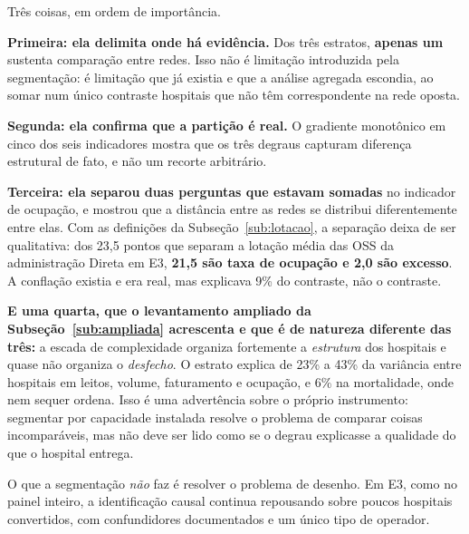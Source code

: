 Três coisas, em ordem de importância.

\textbf{Primeira: ela delimita onde há evidência.} Dos três estratos,
\textbf{apenas um} sustenta comparação entre redes. Isso não é limitação
introduzida pela segmentação: é limitação que já existia e que a análise
agregada escondia, ao somar num único contraste hospitais que não têm
correspondente na rede oposta.

\textbf{Segunda: ela confirma que a partição é real.} O gradiente monotônico
em cinco dos seis indicadores mostra que os três degraus capturam diferença
estrutural de fato, e não um recorte arbitrário.

\textbf{Terceira: ela separou duas perguntas que estavam somadas} no
indicador de ocupação, e mostrou que a distância entre as redes se distribui
diferentemente entre elas. Com as definições da Subseção~\ref{sub:lotacao},
a separação deixa de ser qualitativa: dos 23,5 pontos que separam a lotação
média das OSS da administração Direta em E3, \textbf{21,5 são taxa de
ocupação e 2,0 são excesso}. A conflação existia e era real, mas explicava
9\% do contraste, não o contraste.

\textbf{E uma quarta, que o levantamento ampliado da
Subseção~\ref{sub:ampliada} acrescenta e que é de natureza diferente das
três:} a escada de complexidade organiza fortemente a \emph{estrutura} dos
hospitais e quase não organiza o \emph{desfecho}. O estrato explica de 23\%
a 43\% da variância entre hospitais em leitos, volume, faturamento e
ocupação, e 6\% na mortalidade, onde nem sequer ordena. Isso é uma
advertência sobre o próprio instrumento: segmentar por capacidade instalada
resolve o problema de comparar coisas incomparáveis, mas não deve ser lido
como se o degrau explicasse a qualidade do que o hospital entrega.

O que a segmentação \emph{não} faz é resolver o problema de desenho. Em E3,
como no painel inteiro, a identificação causal continua repousando sobre
poucos hospitais convertidos, com confundidores documentados e um único tipo
de operador.

